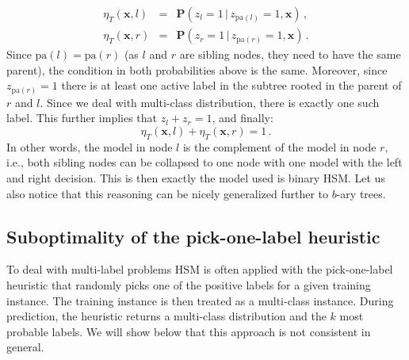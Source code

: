\documentclass{article}
\newcommand{\Algo}[1]{\textsc{#1}}
\renewcommand{\vec}[1]{\boldsymbol{#1}}
\newcommand{\bx}{\vec{x}}
\newcommand{\heta}{\hat{\eta}}
\newcommand{\pa}[1]{\mathrm{pa}(#1)}
\newcommand{\prob}{\mathbf{P}}
\newcommand{\given}{\, | \,}
\newcommand{\sectionBefore}{-0pt}
\newcommand{\sectionAfter}{-0pt}
\begin{document}
{\begin{eqnarray*}
\eta_T(\bx, l) & = & \prob(z_l = 1 \given z_{\pa{l}} =1, \bx)\,,  \\
\eta_T(\bx, r) & = & \prob(z_r = 1 \given z_{\pa{r}} =1, \bx)\,.
\end{eqnarray*}
Since $\pa{l} = \pa{r}$ (as $l$ and $r$ are sibling nodes, they need to have the same parent), the condition in both probabilities above is the same. Moreover, since $z_{\pa{r}} =1$ there is at least one active label in the subtree rooted in the parent of $r$ and $l$. Since we deal with multi-class distribution, there is exactly one such label. This further implies that $z_l + z_r = 1$, and finally: 
\begin{equation}
\eta_T(\bx, l)+ \eta_T(\bx, r) = 1 \,.
\label{eqn:sibling_summation}
\end{equation}
In other words, the model in node $l$ is the complement of the model in node $r$, i.e., both sibling nodes can be collapsed to one node with one model with the left and right decision. This is then exactly the model used is binary \Algo{HSM}. Let us also notice that this reasoning can be nicely generalized further to $b$-ary trees.


\vspace{\sectionBefore}
\subsection{Suboptimality of the pick-one-label heuristic}
\label{sec:pick-one-label}
\vspace{\sectionAfter}

To deal with multi-label problems HSM is often applied with the pick-one-label heuristic that randomly picks one of the positive labels for a given training instance. The training instance is then treated as a multi-class instance. During prediction, the heuristic returns a multi-class distribution and the $k$ most probable labels. 
We will show below that this approach is not consistent in general. 


}
\end{document}

